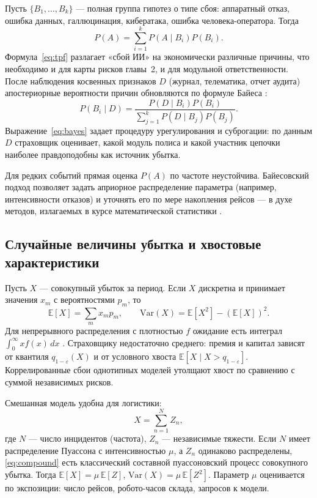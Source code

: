 \documentclass[a4paper,14pt]{extarticle}
\begin{document}
Пусть $\{B_1,\ldots,B_k\}$ --- полная группа гипотез о типе сбоя: аппаратный отказ, ошибка данных, галлюцинация, кибератака, ошибка человека-оператора. Тогда
\begin{equation}
P(A)=\sum_{i=1}^{k} P(A\mid B_i)P(B_i).
\label{eq:tpf}
\end{equation}
Формула~\eqref{eq:tpf} разлагает «сбой ИИ» на экономически различные причины, что необходимо и для карты рисков главы~2, и для модульной ответственности. После наблюдения косвенных признаков $D$ (журнал, телематика, отчет аудита) апостериорные вероятности причин обновляются по формуле Байеса \cite{shvedov}:
\begin{equation}
P(B_i\mid D)=\frac{P(D\mid B_i)P(B_i)}{\sum_{j=1}^{k} P(D\mid B_j)P(B_j)}.
\label{eq:bayes}
\end{equation}
Выражение~\eqref{eq:bayes} задает процедуру урегулирования и суброгации: по данным $D$ страховщик оценивает, какой модуль полиса и какой участник цепочки наиболее правдоподобны как источник убытка.

Для редких событий прямая оценка $P(A)$ по частоте неустойчива. Байесовский подход позволяет задать априорное распределение параметра (например, интенсивности отказов) и уточнять его по мере накопления рейсов --- в духе методов, излагаемых в курсе математической статистики \cite{shvedov}.

\subsection{Случайные величины убытка и хвостовые характеристики}

Пусть $X$ --- совокупный убыток за период. Если $X$ дискретна и принимает значения $x_m$ с вероятностями $p_m$, то
\[
\mathbb{E}[X]=\sum_m x_m p_m,\qquad
\mathrm{Var}(X)=\mathbb{E}[X^2]-(\mathbb{E}[X])^2.
\]
Для непрерывного распределения с плотностью $f$ ожидание есть интеграл $\int_0^\infty x f(x)\,dx$ \cite{shvedov}. Страховщику недостаточно среднего: премия и капитал зависят от квантиля $q_{1-\varepsilon}(X)$ и от условного хвоста $\mathbb{E}[X\mid X>q_{1-\varepsilon}]$. Коррелированные сбои однотипных моделей утолщают хвост по сравнению с суммой независимых рисков.

Смешанная модель удобна для логистики:
\begin{equation}
X=\sum_{n=1}^{N} Z_n,
\label{eq:compound}
\end{equation}
где $N$ --- число инцидентов (частота), $Z_n$ --- независимые тяжести. Если $N$ имеет распределение Пуассона с интенсивностью $\mu$, а $Z_n$ одинаково распределены, \eqref{eq:compound} есть классический составной пуассоновский процесс совокупного убытка. Тогда $\mathbb{E}[X]=\mu\,\mathbb{E}[Z]$, $\mathrm{Var}(X)=\mu\,\mathbb{E}[Z^2]$. Параметр $\mu$ оценивается по экспозиции: число рейсов, робото-часов склада, запросов к модели.
\end{document}
